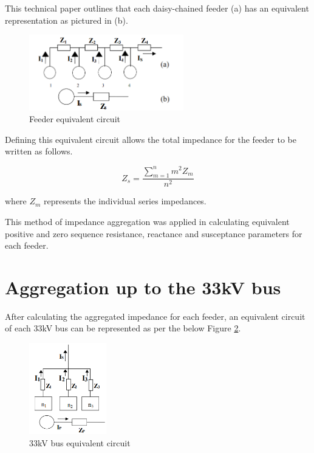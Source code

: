 \documentclass{../grid-link-report}
\begin{document}
	This technical paper outlines that each daisy-chained feeder (a) has an equivalent representation as pictured in (b).
	
	\begin{figure}[h]
		\centering
		\includegraphics[width=0.6\textwidth]{report-assets/images/feeder_equivalence.png}
		\caption{Feeder equivalent circuit}
		\label{fig:feeder_equivalance}
	\end{figure}	
	
	Defining this equivalent circuit allows the total impedance for the feeder to be written as follows.
	
	\begin{equation}
		Z_{s} = \frac{\sum_{m=1}^{n}m^{2}Z_{m}}{n^2}
	\end{equation}
	
	where $Z_{m}$ represents the individual series impedances.
	
	This method of impedance aggregation was applied in calculating equivalent positive and zero sequence resistance, reactance and susceptance parameters for each feeder.
	 
	\section{Aggregation up to the 33kV bus}
	\label{Aggregation Up to the 33kV Bus}	

	After calculating the aggregated impedance for each feeder, an equivalent circuit of each 33kV bus can be represented as per the below Figure \ref{fig:bus_equivalance}.
	
	\begin{figure}[H]
		\centering
		\includegraphics[width=0.3\textwidth]{report-assets/images/bus_equivalence.png}
		\caption{33kV bus equivalent circuit}
		\label{fig:bus_equivalance}
	\end{figure}	
	
\end{document}
